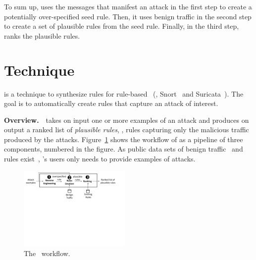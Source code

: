 \documentclass[conference]{IEEEtran}
\begin{document}
To sum up, \tname{} uses the messages that manifest an attack in the
first step to create a potentially over-specified seed rule. Then, it
uses benign traffic in the second step to create a set of plausible
rules from the seed rule. Finally, in the third step, \tname{} ranks the 
plausible rules.

\section{Technique}
\label{sec:technique}

\tname{} is a technique to synthesize rules for rule-based
\nids~(\eg{}, Snort~\cite{snort} and Suricata~\cite{suricata}). The
goal is to automatically create rules that capture an attack of
interest.

\vspace{1ex}
\noindent\textbf{Overview.}~\tname\ takes on input one or more
examples of an attack and produces on output a ranked list of
\emph{plausible rules}, \ie{}, rules capturing only the malicious
traffic produced by the attacks. Figure~\ref{fig:overview} shows the
workflow of \tname{} as a pipeline of three components, numbered in
the figure. As public data sets of benign
traffic~\cite{tcpreplay,stratosphere-normal} and rules
exist~\cite{emerging-threats-open}, \tname{}'s users only needs to
provide examples of attacks.


\begin{figure}[t!]
  \centering
  \includegraphics[trim=0 340 50 0,clip,width=0.48\textwidth]{figs/nids-workflow}
  \caption{The \tname\ workflow.}
  \label{fig:overview}
  \vspace{-4ex}
\end{figure}


\end{document}

